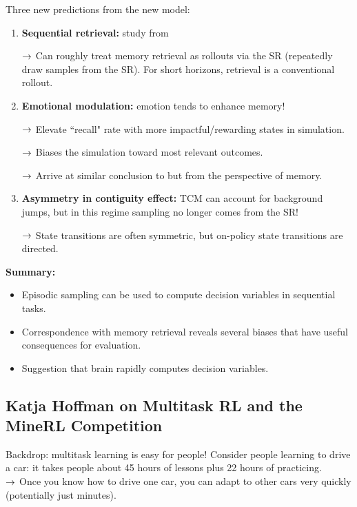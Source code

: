 Three new predictions from the new model:
\begin{enumerate}
    \item {\bf Sequential retrieval:} study from~\citet{preston2013interplay}
    
    $\rightarrow$ Can roughly treat memory retrieval as rollouts via the SR (repeatedly draw samples from the SR). For short horizons, retrieval is a conventional rollout.
    
    \item {\bf Emotional modulation:} emotion tends to enhance memory!
    
    $\rightarrow$ Elevate ``recall" rate with more impactful/rewarding states in simulation.
    
    $\rightarrow$ Biases the simulation toward most relevant outcomes.
    
    $\rightarrow$ Arrive at similar conclusion to \citet{lieder2019resource} but from the perspective of memory.
    \item {\bf Asymmetry in contiguity effect:} TCM can account for background jumps, but in this regime sampling no longer comes from the SR!
    
    $\rightarrow$ State transitions are often symmetric, but on-policy state transitions are directed.

\end{enumerate}

{\bf Summary:}
\begin{itemize}
    \item Episodic sampling can be used to compute decision variables in sequential tasks.
    \item Correspondence with memory retrieval reveals several biases that have useful consequences for evaluation.
    \item Suggestion that brain rapidly computes decision variables.
\end{itemize}

\spacerule


\subsection{Katja Hoffman on Multitask RL and the MineRL Competition}

Backdrop: multitask learning is easy for people! Consider people learning to drive a car: it takes people about 45 hours of lessons plus 22 hours of practicing. \\

$\rightarrow$ Once you know how to drive one car, you can adapt to other cars very quickly (potentially just minutes). \\

